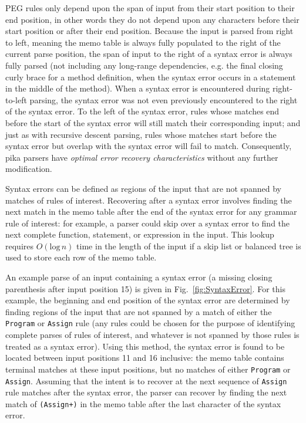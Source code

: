 \documentclass[manuscript,screen]{acmart}
\begin{document}
PEG rules only depend upon the span of input from their start position to their end position, in other words they do not depend upon any characters before their start position or after their end position. Because the input is parsed from right to left, meaning the memo table is always fully populated to the right of the current parse position, the span of input to the right of a syntax error is always fully parsed (not including any long-range dependencies, e.g. the final closing curly brace for a method definition, when the syntax error occurs in a statement in the middle of the method). When a syntax error is encountered during right-to-left parsing, the syntax error was not even previously encountered to the right of the syntax error. To the left of the syntax error, rules whose matches end before the start of the syntax error will still match their corresponding input; and just as with recursive descent parsing, rules whose matches start before the syntax error but overlap with the syntax error will fail to match. Consequently, pika parsers have \emph{optimal error recovery characteristics} without any further modification.

Syntax errors can be defined as regions of the input that are not spanned by matches of rules of interest. Recovering after a syntax error involves finding the next match in the memo table after the end of the syntax error for any grammar rule of interest: for example, a parser could skip over a syntax error to find the next complete function, statement, or expression in the input. This lookup requires $O(\mathrm{log} \, n)$ time in the length of the input if a skip list or balanced tree is used to store each row of the memo table.

An example parse of an input containing a syntax error (a missing closing parenthesis after input position 15) is given in Fig.~\ref{fig:SyntaxError}. For this example, the beginning and end position of the syntax error are determined by finding regions of the input that are not spanned by a match of either the \texttt{Program} or \texttt{Assign} rule (any rules could be chosen for the purpose of identifying complete parses of rules of interest, and whatever is not spanned by those rules is treated as a syntax error). Using this method, the syntax error is found to be located between input positions 11 and 16 inclusive: the memo table contains terminal matches at these input positions, but no matches of either \texttt{Program} or \texttt{Assign}. Assuming that the intent is to recover at the next sequence of \texttt{Assign} rule matches after the syntax error, the parser can recover by finding the next match of \texttt{(Assign+)} in the memo table after the last character of the syntax error.
\end{document}
